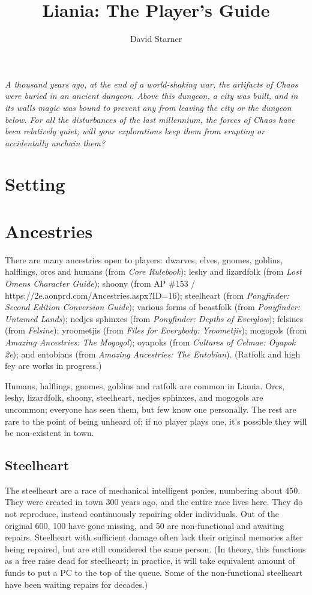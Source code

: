\documentclass{report}
\title{Liania: The Player's Guide}
\author{David Starner}
\begin{document}
\maketitle
\emph{A thousand years ago, at the end of a world-shaking war, the artifacts of
Chaos were buried in an ancient dungeon. Above this dungeon, a city was built,
and in its walls magic was bound to prevent any from leaving the city or the
dungeon below. For all the disturbances of the last millennium, the forces
of Chaos have been relatively quiet; will your explorations keep them from
erupting or accidentally unchain them?}

\chapter{Setting}

\chapter{Ancestries}

There are many ancestries open to players: dwarves, elves, gnomes, goblins,
halflings, orcs and humans (from \emph{Core Rulebook}); leshy and lizardfolk (from
\emph{Lost Omens Character Guide}); shoony (from AP \#153 / https://2e.aonprd.com/Ancestries.aspx?ID=16);
steelheart (from \emph{Ponyfinder: Second Edition Conversion Guide}); various forms
of beastfolk (from \emph{Ponyfinder: Untamed Lands}); nedjes sphinxes (from \emph{Ponyfinder:
Depths of Everglow}); felsines (from \emph{Felsine}); yroometjis (from
\emph{Files for Everybody: Yroometjis}); mogogols (from
\emph{Amazing Ancestries: The Mogogol}); oyapoks (from
\emph{Cultures of Celmae: Oyapok 2e}); and entobians (from
\emph{Amazing Ancestries: The Entobian}). (Ratfolk and high fey are works in
progress.)

Humans, halflings, gnomes, goblins and ratfolk are common in Liania.
Orcs, leshy, lizardfolk, shoony, steelheart, nedjes sphinxes, and mogogols are
uncommon; everyone has seen them, but few know one personally. The rest are
rare to the point of being unheard of; if no player plays one, it's possible
they will be non-existent in town.

\section{Steelheart}

The steelheart are a race of mechanical intelligent ponies, numbering about 450.
They were created in town 300 years ago, and the entire race lives here. They
do not reproduce, instead continuously repairing older individuals. Out of the
original 600, 100 have gone missing, and 50 are non-functional and awaiting
repairs. Steelheart with sufficient damage often lack their original memories
after being repaired, but are still considered the same person. (In theory,
this functions as a free raise dead for steelheart; in practice, it will
take equivalent amount of funds to put a PC to the top of the queue. Some
of the non-functional steelheart have been waiting repairs for decades.)
\end{document}
